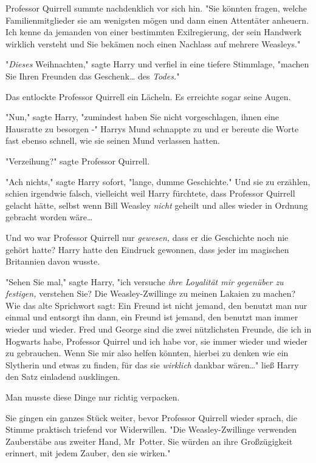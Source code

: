 {Professor Quirrell summte nachdenklich vor sich hin. "Sie könnten fragen, welche Familienmitglieder sie am wenigsten mögen und dann einen Attentäter anheuern. Ich kenne da jemanden von einer bestimmten Exilregierung, der sein Handwerk wirklich versteht und Sie bekämen noch einen Nachlass auf mehrere Weasleys."

"\emph{Dieses} Weihnachten," sagte Harry und verfiel in eine tiefere Stimmlage, "machen Sie Ihren Freunden das Geschenk… des \emph{Todes.}"

Das entlockte Professor Quirrell ein Lächeln. Es erreichte sogar seine Augen.

"Nun," sagte Harry, "zumindest haben Sie nicht vorgeschlagen, ihnen eine Hausratte zu besorgen -" Harrys Mund schnappte zu und er bereute die Worte fast ebenso schnell, wie sie seinen Mund verlassen hatten.

"Verzeihung?" sagte Professor Quirrell.

"Ach nichts," sagte Harry sofort, "lange, dumme Geschichte." Und sie zu erzählen, schien irgendwie falsch, vielleicht weil Harry fürchtete, dass Professor Quirrell gelacht hätte, selbst wenn Bill Weasley \emph{nicht} geheilt und alles wieder in Ordnung gebracht worden wäre…

Und wo war Professor Quirrell nur \emph{gewesen,} dass er die Geschichte noch nie gehört hatte? Harry hatte den Eindruck gewonnen, dass jeder im magischen Britannien davon wusste.

"Sehen Sie mal," sagte Harry, "ich versuche \emph{ihre Loyalität mir gegenüber zu festigen,} verstehen Sie? Die Weasley-Zwillinge zu meinen Lakaien zu machen? Wie das alte Sprichwort sagt: Ein Freund ist nicht jemand, den benutzt man nur einmal und entsorgt ihn dann, ein Freund ist jemand, den benutzt man immer wieder und wieder. Fred und George sind die zwei nützlichsten Freunde, die ich in Hogwarts habe, Professor Quirrel und ich habe vor, sie immer wieder und wieder zu gebrauchen. Wenn Sie mir also helfen könnten, hierbei zu denken wie ein Slytherin und etwas zu finden, für das sie \emph{wirklich} dankbar wären…" ließ Harry den Satz einladend ausklingen.

Man musste diese Dinge nur richtig verpacken.

Sie gingen ein ganzes Stück weiter, bevor Professor Quirrell wieder sprach, die Stimme praktisch triefend vor Widerwillen. "Die Weasley-Zwillinge verwenden Zauberstäbe aus zweiter Hand, Mr~Potter. Sie würden an ihre Großzügigkeit erinnert, mit jedem Zauber, den sie wirken."

}
